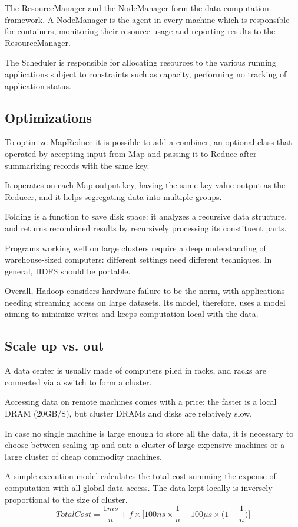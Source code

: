 The ResourceManager and the NodeManager form the data computation framework. A NodeManager is the agent in every machine which is responsible for containers, monitoring their resource usage and reporting results to the ResourceManager.

The Scheduler is responsible for allocating resources to the various running applications subject to constraints such as capacity, performing no tracking of application status.

\subsection{Optimizations}
To optimize MapReduce it is possible to add a combiner, an optional class that operated by accepting input from Map and passing it to Reduce after summarizing records with the same key.

It operates on each Map output key, having the same key-value output as the Reducer, and it helps segregating data into multiple groups.

Folding is a function to save disk space: it analyzes a recursive data structure, and returns recombined results by recursively processing its constituent parts.

Programs working well on large clusters require a deep understanding of warehouse-sized computers: different settings need different techniques. In general, HDFS should be portable.

Overall, Hadoop considers hardware failure to be the norm, with applications needing streaming access on large datasets. Its model, therefore, uses a model aiming to minimize writes and keeps computation local with the data.

\subsection{Scale up vs. out}
A data center is usually made of computers piled in racks, and racks are connected via a switch to form a cluster.

Accessing data on remote machines comes with a price: the faster is a local DRAM (20GB/S), but cluster DRAMs and disks are relatively slow. 

In case no single machine is large enough to store all the data, it is necessary to choose between scaling up and out: a cluster of large expensive machines or a large cluster of cheap commodity machines.

A simple execution model calculates the total cost summing the expense of computation with all global data access. The data kept locally is inversely proportional to the size of cluster.
$$ TotalCost = \frac{1ms}{n} + f \times \Big[100ns \times \frac{1}{n} + 100\mu s \times \Big(1 - \frac{1}{n}\Big) \Big]$$

